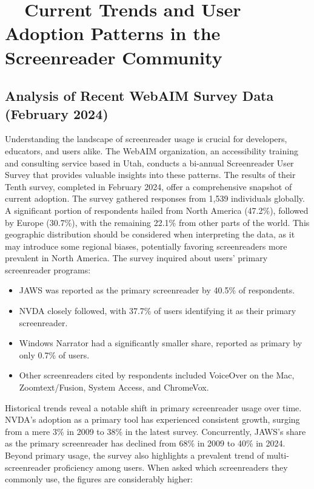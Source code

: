 \section{~~Current Trends and User Adoption Patterns in the Screenreader Community}

\subsection{Analysis of Recent WebAIM Survey Data (February 2024)}
Understanding the landscape of screenreader usage is crucial for developers, educators, and users alike. The WebAIM organization, an accessibility training and consulting service based in Utah, conducts a bi-annual Screenreader User Survey that provides valuable insights into these patterns.\supercite{kingsbury2025} The results of their Tenth survey, completed in February 2024, offer a comprehensive snapshot of current adoption.
The survey gathered responses from 1,539 individuals globally. A significant portion of respondents hailed from North America (47.2\%), followed by Europe (30.7\%), with the remaining 22.1\% from other parts of the world.\supercite{kingsbury2025} This geographic distribution should be considered when interpreting the data, as it may introduce some regional biases, potentially favoring screenreaders more prevalent in North America.\supercite{kingsbury2025}
The survey inquired about users' primary screenreader programs:
\begin{itemize}
	\item JAWS was reported as the primary screenreader by 40.5\% of respondents.\supercite{kingsbury2025}
	\item NVDA closely followed, with 37.7\% of users identifying it as their primary screenreader.\supercite{kingsbury2025}
	\item Windows Narrator had a significantly smaller share, reported as primary by only 0.7\% of users.\supercite{kingsbury2025}
	\item Other screenreaders cited by respondents included VoiceOver on the Mac, Zoomtext/Fusion, System Access, and ChromeVox.\supercite{kingsbury2025}
\end{itemize}
Historical trends reveal a notable shift in primary screenreader usage over time. NVDA's adoption as a primary tool has experienced consistent growth, surging from a mere 3\% in 2009 to 38\% in the latest survey. Concurrently, JAWS's share as the primary screenreader has declined from 68\% in 2009 to 40\% in 2024.\supercite{kingsbury2025}
Beyond primary usage, the survey also highlights a prevalent trend of multi-screenreader proficiency among users. When asked which screenreaders they commonly use, the figures are considerably higher:
